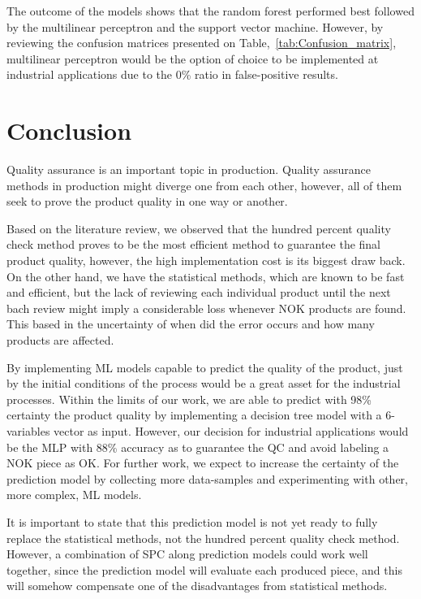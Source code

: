 \documentclass[5p,times,procedia]{elsarticle}
\begin{document}
The outcome of the models shows that the random forest performed best followed by the multilinear perceptron and the support vector machine. However, by reviewing the confusion matrices presented on Table,~\ref{tab:Confusion_matrix}, multilinear perceptron would be the option of choice to be implemented at industrial applications due to the 0\% ratio in false-positive results.

\section{Conclusion}

Quality assurance is an important topic in production. Quality assurance methods in production might diverge one from each other, however, all of them seek to prove the product quality in one way or another. 

Based on the literature review, we observed that the hundred percent quality check method proves to be the most efficient method to guarantee the final product quality, however, the high implementation cost is its biggest draw back. On the other hand, we have the statistical methods, which are known to be fast and efficient, but the lack of reviewing each individual product until the next bach review might imply a considerable loss whenever NOK products are found. This based in the uncertainty of when did the error occurs and how many products are affected.

By implementing ML models capable to predict the quality of the product, just by the initial conditions of the process would be a great asset for the industrial processes. Within the limits of our work, we are able to predict with 98\% certainty the product quality by implementing a decision tree model with a 6-variables vector as input. 
However, our decision for industrial applications would be the MLP with 88\% accuracy as to guarantee the QC and avoid labeling a NOK piece as OK. For further work, we expect to increase the certainty of the prediction model by collecting more data-samples and experimenting with other, more complex, ML models.

It is important to state that this prediction model is not yet ready to fully replace the statistical methods, not the hundred percent quality check method. However, a combination of SPC along prediction models could work well together, since the prediction model will evaluate each produced piece, and this will somehow compensate one of the disadvantages from statistical methods.
\end{document}
